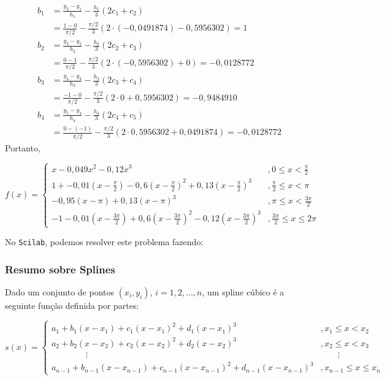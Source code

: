 \begin{align*}
b_1&= \frac{y_{2}-y_1}{h_1}-\frac{h_1}{3}(2c_1+c_{2})\\
&=\frac{1-0}{\pi/2}-\frac{\pi/2}{3}(2\cdot (-0,0491874)-0,5956302)=1\\
b_2&=\frac{y_{3}-y_2}{h_2}-\frac{h_2}{3}(2c_2+c_{3})\\
&=\frac{0-1}{\pi/2}-\frac{\pi/2}{3}(2\cdot(-0,5956302) +0)=-0,0128772\\
b_3&=\frac{y_{4}-y_3}{h_3}-\frac{h_3}{3}(2c_3+c_{4})\\
&=\frac{-1-0}{\pi/2}-\frac{\pi/2}{3}(2\cdot 0+0,5956302)=-0,9484910\\
b_4&=\frac{y_{5}-y_4}{h_4}-\frac{h_4}{3}(2c_4+c_{5})\\
&=\frac{0-(-1)}{\pi/2}-\frac{\pi/2}{3}(2\cdot 0,5956302+0,0491874)=-0,0128772
\end{align*}
Portanto,
\begin{small}
\begin{equation*}
f(x)=\left\{\begin{array}{ll}
x-0,049x^2-0,12x^3&, 0\leq x<\frac{\pi}{2}\\
1+-0,01(x-\frac{\pi}{2})-0,6(x-\frac{\pi}{2})^2+0,13(x-\frac{\pi}{2})^3&, \frac{\pi}{2}\leq x<\pi\\
-0,95(x-\pi)+0,13(x-\pi)^3&, \pi\leq x<\frac{3\pi}{2}\\
-1-0,01(x-\frac{3\pi}{2})+0,6(x-\frac{3\pi}{2})^2-0,12(x-\frac{3\pi}{2})^3&, \frac{3\pi}{2}\leq x\leq2\pi
\end{array}\right.
\end{equation*}  
\end{small}

\ifisscilab
No \verb+Scilab+, podemos resolver este problema fazendo:

\fi

\subsubsection{Resumo sobre Splines}

Dado um conjunto de pontos $(x_i,y_i)$, $i=1,2,\ldots,n$, um spline cúbico é a seguinte função definida por partes:
\begin{small}
\begin{equation*}
  s(x) \!=\! \left\{\begin{array}{ll}
       \!\!\!a_1 \!+\! b_1(x\!-\!x_1) \!+\! c_1(x\!-\!x_1)^2 \!+\! d_1(x\!-\!x_1)^3 &\!\!\!\!\!, x_1\leq x < x_2\\
      \!\!\!a_2 \!+\! b_2(x\!-\!x_2) \!+\! c_2(x\!-\!x_2)^2 \!+\! d_2(x\!-\!x_2)^3 &\!\!\!\!\!, x_2 \leq x < x_3\\
      \qquad\qquad \vdots & \qquad\vdots \\
      \!\!\!a_{n-1} \!+\! b_{n-1}(x\!-\!x_{n-1}) \!+\! c_{n-1}(x\!-\!x_{n-1})^2 \!+\! d_{n-1}(x\!-\!x_{n-1})^3 &\!\!\!\!\!, x_{n-1} \leq x \leq x_n \end{array}\right.
\end{equation*}  
\end{small}

